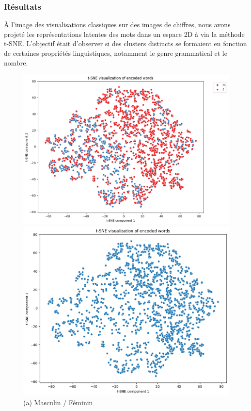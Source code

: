 \documentclass{article}
\begin{document}
\subsubsection{Résultats}

À l’image des visualisations classiques sur des images de chiffres, nous avons projeté les représentations latentes des mots dans un espace 2D à via la méthode t-SNE. L’objectif était d’observer si des clusters distincts se formaient en fonction de certaines propriétés linguistiques, notamment le genre grammatical et le nombre.

\begin{figure}[H]
    \centering
    \begin{minipage}[b]{0.32\textwidth}
        \centering
        \includegraphics[width=\textwidth]{Images/tsne_mf.png}
        \caption*{(a) Masculin / Féminin}
        \label{fig:mf}
    \end{minipage}
    \hfill
    \begin{minipage}[b]{0.32\textwidth}
        \centering
        \includegraphics[width=\textwidth]{Images/tsne_m.png}

\end{minipage}
\end{figure}
\end{document}
